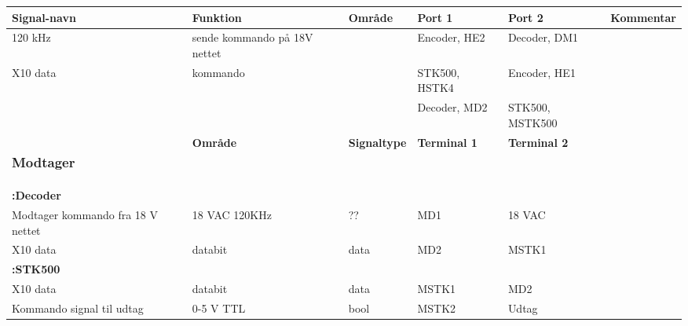 \begin{table}[htbp]
\begin{tabular}{|p{2cm}|p{2cm}|p{2cm}|p{2cm}|p{2cm}|p{}|}
\hline
\textbf{Signal-navn} & \textbf{Funktion} & \textbf{Område} & \textbf{Port 1} & \textbf{Port 2} & \textbf{Kommentar} \\ \hline

120 kHz & sende kommando på 18V nettet & & Encoder, HE2 & Decoder, DM1 & \\ \hline

X10 data & kommando & & STK500, HSTK4 & Encoder, HE1 & \\
&&& Decoder, MD2 & STK500, MSTK500 &\\ \hline

\subsubsection{Modtager}
\begin{tabular}{|p{3cm}|p{}|p{}|p{}|p{}|}
\hline 
\textbf{Funktion} &\textbf{Område} &\textbf{Signaltype} &\textbf{Terminal 1} &\textbf{Terminal 2} \\ 
\hline 
\multicolumn{5}{|l|}{\textbf{:Decoder}} \\ 
\hline 
Modtager kommando fra 18 V nettet &18 VAC \newline 120KHz &?? &MD1 &18 VAC\\ 
\hline 
X10 data &databit &data &MD2 &MSTK1\\ 
\hline 
\multicolumn{5}{|l|}{\textbf{:STK500}} \\ 
\hline 
X10 data &databit &data &MSTK1 &MD2\\ 
\hline 
Kommando signal til udtag  &0-5 V TTL &bool &MSTK2 &Udtag\\ 
\hline 


\end{tabular} 
\end{table}
